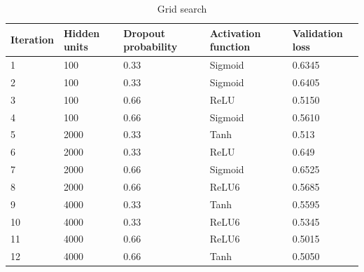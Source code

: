 \documentclass[12pt,fleqn]{article}
\begin{document}
 
\begin{table}[H]
	\caption{Grid search \label{grid}}
	\centering
	\begin{tabular}{|l|l|l|l|l|}
		\hline
		Iteration & Hidden units & Dropout probability & Activation function & Validation loss \\ \hline
		1         & 100          & 0.33                & Sigmoid             & 0.6345          \\ \hline
		2         & 100          & 0.33                & Sigmoid             & 0.6405          \\ \hline
		3         & 100          & 0.66                & ReLU                & 0.5150          \\ \hline
		4         & 100          & 0.66                & Sigmoid             & 0.5610          \\ \hline
		5         & 2000         & 0.33                & Tanh                & 0.513           \\ \hline
		6         & 2000         & 0.33                & ReLU                & 0.649           \\ \hline
		7         & 2000         & 0.66                & Sigmoid             & 0.6525          \\ \hline
		8         & 2000         & 0.66                & ReLU6               & 0.5685          \\ \hline
		9         & 4000         & 0.33                & Tanh                & 0.5595          \\ \hline
		10        & 4000         & 0.33                & ReLU6               & 0.5345          \\ \hline
		11        & 4000         & 0.66                & ReLU6               & 0.5015          \\ \hline
		12        & 4000         & 0.66                & Tanh                & 0.5050          \\ \hline
	\end{tabular}
\end{table}
\end{document}
